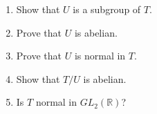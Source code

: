 {\begin{enumerate}
\begin{enumerate}
 \item 
Show that $U$ is a subgroup of $T$.
 
 \item 
Prove that $U$ is abelian.
 
 \item 
Prove that $U$ is normal in $T$.
 
 \item  
Show that $T/U$ is abelian.
 
 \item
Is $T$ normal in $GL_2( {\mathbb R})$?
 
\end{enumerate}
 
 
% 
% 
% 
% 
% 
% 
 
 
% 
% 
% 
% 
% 
 
 
 
 
 

\end{enumerate}}
